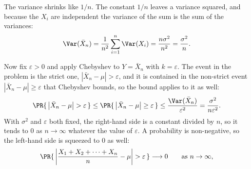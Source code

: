 \documentclass[11pt]{article}
\begin{document}
The variance shrinks like $1/n$. The constant $1/n$ leaves a variance squared, and because
the $X_{i}$ are independent the variance of the sum is the sum of the variances:
\[
  \Var(\bar{X}_{n})
    = \frac{1}{n^{2}} \sum_{i=1}^{n} \Var(X_{i})
    = \frac{n\sigma^{2}}{n^{2}}
    = \frac{\sigma^{2}}{n} .
\]

Now fix $\varepsilon > 0$ and apply Chebyshev to $Y = \bar{X}_{n}$ with $k = \varepsilon$.
The event in the problem is the strict one, $\left| \bar{X}_{n} - \mu \right| >
\varepsilon$, and it is contained in the non-strict event $\left| \bar{X}_{n} - \mu \right|
\ge \varepsilon$ that Chebyshev bounds, so the bound applies to it as well:
\[
  \PR{\,\left| \bar{X}_{n} - \mu \right| > \varepsilon\,}
    \le \PR{\,\left| \bar{X}_{n} - \mu \right| \ge \varepsilon\,}
    \le \frac{\Var(\bar{X}_{n})}{\varepsilon^{2}}
    = \frac{\sigma^{2}}{n\varepsilon^{2}} .
\]
With $\sigma^{2}$ and $\varepsilon$ both fixed, the right-hand side is a constant divided
by $n$, so it tends to $0$ as $n \to \infty$ whatever the value of $\varepsilon$. A
probability is non-negative, so the left-hand side is squeezed to $0$ as well:
\[
  \PR{\,\left| \frac{X_{1} + X_{2} + \cdots + X_{n}}{n} - \mu \right| > \varepsilon\,}
    \longrightarrow 0
  \qquad \text{as } n \to \infty ,
\]
\end{document}

